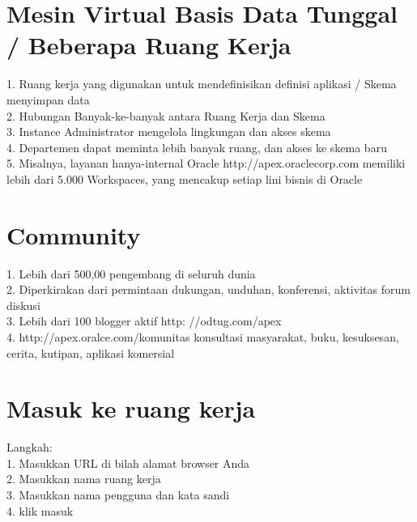 \documentclass[12pt, times new roman, a4paper]{article}
\begin{document}
\section{Mesin Virtual Basis Data Tunggal / Beberapa Ruang Kerja}
1. Ruang kerja yang digunakan untuk mendefinisikan definisi aplikasi / Skema menyimpan data\\
2. Hubungan Banyak-ke-banyak antara Ruang Kerja dan Skema\\
3. Instance Administrator mengelola lingkungan dan akses skema\\
4. Departemen dapat meminta lebih banyak ruang, dan akses ke skema baru\\
5. Misalnya, layanan hanya-internal Oracle http://apex.oraclecorp.com memiliki lebih dari 5.000 Workspaces, yang mencakup setiap lini bisnis di Oracle\\

\section{Community}
1. Lebih dari 500,00 pengembang di seluruh dunia\\
2. Diperkirakan dari permintaan dukungan, unduhan, konferensi, aktivitas forum diskusi\\
3. Lebih dari 100 blogger aktif http: //odtug.com/apex\\
4. http://apex.oralce.com/komunitas konsultasi masyarakat, buku, kesuksesan, cerita, kutipan, aplikasi komersial\\

\section{Masuk ke ruang kerja}
Langkah:\\
1. Masukkan URL di bilah alamat browser Anda\\
2. Masukkan nama ruang kerja\\
3. Masukkan nama pengguna dan kata sandi\\
4. klik masuk\\
\end{document}

